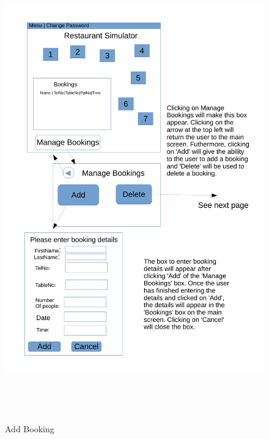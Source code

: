 \begin{figure}[H]
    \includegraphics[height = 20cm]{./Design/Images/Interface5}
    \caption{Add Booking} \label{fig:Booking}
\end{figure}

